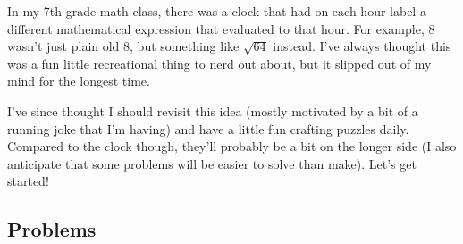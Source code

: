In my 7th grade math class,
there was a clock that had on each hour label a different mathematical
expression that evaluated to that hour. For example, \( 8 \) wasn't just plain
old \( 8 \), but something like \( \sqrt{64} \) instead. I've always thought
this was a fun little recreational thing to nerd out about, but it slipped out
of my mind for the longest time.

I've since thought I should revisit this idea (mostly motivated by a bit of a
running joke that I'm having) and have a little fun crafting puzzles daily.
Compared to the clock though, they'll probably be a bit on the longer side (I
also anticipate that some problems will be easier to solve than make). Let's
get started!

\subsection{Problems}
